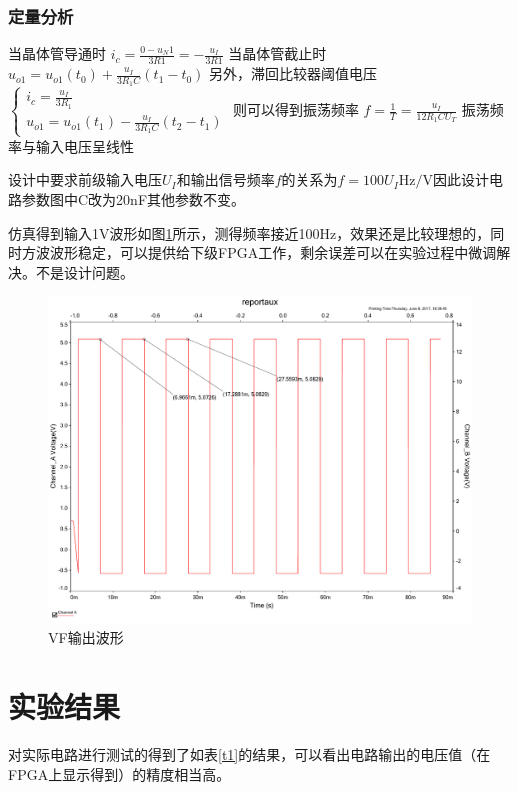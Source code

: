 \documentclass[UTF8,a4paper,landscape,16pt]{paper}
\begin{document}
\begin{multicols}{4}
\subsubsection{定量分析}
\noindent 当晶体管导通时
$i_c=\frac{0-u_N1}{3R1}=-\frac{u_I}{3R1}$
当晶体管截止时
$u_{o1} = u_{o1}(t_0)+\frac{u_I}{3R_1C}(t_1-t_0)$
另外，滞回比较器阈值电压
$\begin{cases}
i_c = \frac{u_I}{3R_1}\\
u_{o1} = u_{o1}(t_1)-\frac{u_I}{3R_1C}(t_2-t_1)
\end{cases}$
则可以得到振荡频率
\noindent $f=\frac{1}{T}=\frac{u_I}{12R_1CU_T}$
振荡频率与输入电压呈线性

\noindent 设计中要求前级输入电压$U_I$和输出信号频率$f$的关系为$f = 100 U_I \mathrm{Hz/V}$因此设计电路参数图中C改为20nF其他参数不变。

\noindent 仿真得到输入1V波形如图\ref{f6}所示，测得频率接近100Hz，效果还是比较理想的，同时方波波形稳定，可以提供给下级FPGA工作，剩余误差可以在实验过程中微调解决。不是设计问题。

\begin{figure}[H]
\centering
\includegraphics[width=\columnwidth]{f6.pdf}
\caption{VF输出波形}
\label{f6}
\end{figure}

\section{实验结果}\small
\noindent 对实际电路进行测试的得到了如表\ref{t1}的结果，可以看出电路输出的电压值（在FPGA上显示得到）的精度相当高。


\end{multicols}
\end{document}
